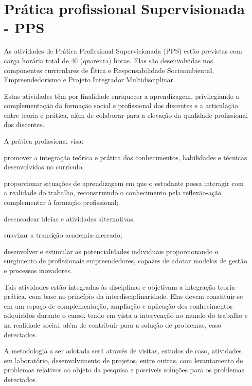 \documentclass[
	12pt,				%
	openright,			%
	twoside,			%
	a4paper,			%
	chapter=TITLE,		%
	english,			%
	french,				%
	spanish,			%
	brazil,				%
	]{abntex2}
\begin{document}
\chapter{Prática profissional Supervisionada - PPS}
As atividades de Prática Profissional Supervisionada (PPS) estão previstas
com carga horária total de 40 (quarenta) horas. Elas são desenvolvidas nos
componentes curriculares de Ética e Responsabilidade Socioambiental, Empreendedorismo e Projeto Integrador Multidisciplinar.

Estas atividades têm por finalidade enriquecer a aprendizagem, privilegiando a
complementação da formação social e profissional dos discentes e a articulação
entre teoria e prática, além de colaborar para a elevação da qualidade
profissional dos discentes.

A prática profissional visa:
\begin{alineas}
	\item promover a integração teórica e prática dos conhecimentos, habilidades e
técnicas desenvolvidas no currículo;
	\item proporcionar situações de aprendizagem em que o estudante possa
interagir com a realidade do trabalho, reconstruindo o conhecimento pela
reflexão-ação complementar à formação profissional;
	\item desencadear ideias e atividades alternativas;
	\item suavizar a transição academia-mercado;
	\item desenvolver e estimular as potencialidades individuais proporcionando o
surgimento de profissionais empreendedores, capazes de adotar modelos
de gestão e processos inovadores. 
	 	
\end{alineas}

Tais atividades estão integradas às disciplinas e objetivam a integração teoria-
prática, com base no princípio da interdisciplinaridade. Elas devem constituir-se em
um espaço de complementação, ampliação e aplicação dos conhecimentos adquiridos
durante o curso, tendo em vista a intervenção no mundo do trabalho e na realidade
social, além de contribuir para a solução de problemas, caso detectados.


A metodologia a ser adotada será através de visitas, estudos de caso,
atividades em laboratório, desenvolvimento de projetos, entre outras, com
levantamento de problemas relativos ao objeto da pesquisa e possíveis soluções para
os problemas detectados.
\end{document}
